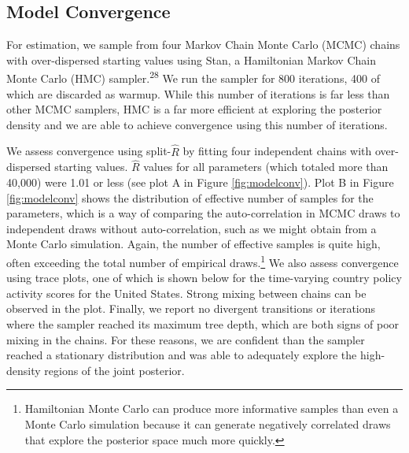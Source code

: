 \documentclass[
]{article}
\begin{document}
\hypertarget{model-convergence}{%
\subsection*{Model Convergence}\label{model-convergence}}

For estimation, we sample from four Markov Chain Monte Carlo (MCMC) chains with over-dispersed starting values using Stan, a Hamiltonian Markov Chain Monte Carlo (HMC) sampler.\textsuperscript{28} We run the sampler for 800 iterations, 400 of which are discarded as warmup. While this number of iterations is far less than other MCMC samplers, HMC is a far more efficient at exploring the posterior density and we are able to achieve convergence using this number of iterations.

We assess convergence using split-\(\hat{R}\) by fitting four independent chains with over-dispersed starting values. \(\hat{R}\) values for all parameters (which totaled more than 40,000) were 1.01 or less (see plot A in Figure \ref{fig:modelconv}). Plot B in Figure \ref{fig:modelconv} shows the distribution of effective number of samples for the parameters, which is a way of comparing the auto-correlation in MCMC draws to independent draws without auto-correlation, such as we might obtain from a Monte Carlo simulation. Again, the number of effective samples is quite high, often exceeding the total number of empirical draws.\footnote{Hamiltonian Monte Carlo can produce more informative samples than even a Monte Carlo simulation because it can generate negatively correlated draws that explore the posterior space much more quickly.} We also assess convergence using trace plots, one of which is shown below for the time-varying country policy activity scores for the United States. Strong mixing between chains can be observed in the plot. Finally, we report no divergent transitions or iterations where the sampler reached its maximum tree depth, which are both signs of poor mixing in the chains. For these reasons, we are confident than the sampler reached a stationary distribution and was able to adequately explore the high-density regions of the joint posterior.
\end{document}
